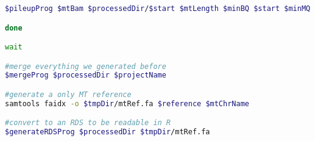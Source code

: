 \begin{lstlisting}[language=bash, caption=Preprocessing of mitochondrial reads and variants for analysis in R, label={lst-cascadeAppendix:mitoPreProcessing}]
    $pileupProg $mtBam $processedDir/$start $mtLength $minBQ $start $minMQ &

done

wait

#merge everything we generated before
$mergeProg $processedDir $projectName

#generate a only MT reference
samtools faidx -o $tmpDir/mtRef.fa $reference $mtChrName

#convert to an RDS to be readable in R
$generateRDSProg $processedDir $tmpDir/mtRef.fa

\end{lstlisting}